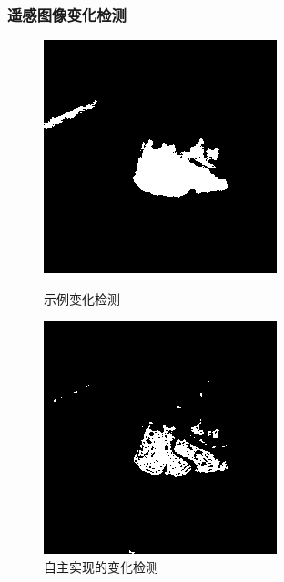 \subsubsection{遥感图像变化检测}
\begin{figure}[H]
	\centering
	\begin{minipage}{0.45\linewidth}
		\includegraphics[width=\linewidth]{figure/san_gt.bmp}
		\caption{示例变化检测}
	\end{minipage}
	\begin{minipage}{0.45\linewidth}
		\includegraphics[width=\linewidth]{figure/exp2compare.png}
		\caption{自主实现的变化检测}
	\end{minipage}
\end{figure}
